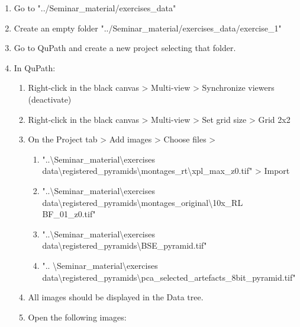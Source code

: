 	\begin{enumerate}
		\def\labelenumi{\arabic{enumi}.}
		\item
		Go to "../Seminar\_material/exercises\_data"
		\item
		Create an empty folder "../Seminar\_material/exercises\_data/exercise\_1"
		\item
		Go to QuPath and create a new project selecting that folder.
		\item
		In QuPath:
		
		\begin{enumerate}
			\def\labelenumii{\alph{enumii}.}
			\item
			Right-click in the black canvas \textgreater{} Multi-view \textgreater{} Synchronize viewers (deactivate)
			\item
			Right-click in the black canvas \textgreater{} Multi-view \textgreater{} Set grid size \textgreater{} Grid 2x2
			\item
			On the Project tab \textgreater{} Add images \textgreater{} Choose files \textgreater{}
			
			\begin{enumerate}
				\def\labelenumiii{\roman{enumiii}.}
				\item
				"..\textbackslash Seminar\_material\textbackslash exercises data\textbackslash registered\_pyramids\textbackslash montages\_rt\textbackslash xpl\_max\_z0.tif" \textgreater{} Import
				\item
				"..\textbackslash Seminar\_material\textbackslash exercises data\textbackslash registered\_pyramids\textbackslash montages\_original\textbackslash10x\_RL BF\_01\_z0.tif"
				\item
				"..\textbackslash Seminar\_material\textbackslash exercises data\textbackslash registered\_pyramids\textbackslash BSE\_pyramid.tif"
				\item
				".. \textbackslash Seminar\_material\textbackslash exercises data\textbackslash registered\_pyramids\textbackslash pca\_selected\_artefacts\_8bit\_pyramid.tif"
			\end{enumerate}
			\item
			All images should be displayed in the Data tree.
			\item
			Open the following images:
			

\end{enumerate}
\end{enumerate}
